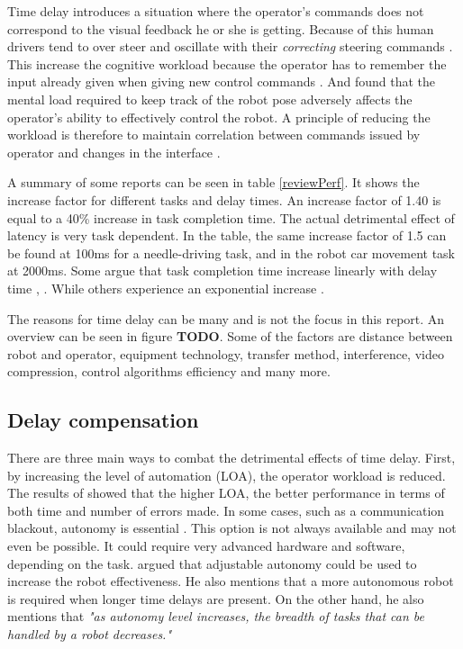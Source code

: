 Time delay introduces a situation where the operator's commands does not correspond to the visual feedback he or she is getting. Because of this human drivers tend to over steer and oscillate with their \emph{correcting} steering commands \citep{Appelqvist2007}. This increase the cognitive workload because the operator has to remember the input already given when giving new control commands \citep{Matheson2013}. And \citep{Ricks2004} found that the mental load required to keep track of the robot pose adversely affects the operator's ability to effectively control the robot. A principle of reducing the workload is therefore to maintain correlation between commands issued by operator and changes in the interface \citep{Nielsen2007}. 

A summary of some reports can be seen in table \ref{reviewPerf}. It shows the increase factor for different tasks and delay times. An increase factor of 1.40 is equal to a 40\% increase in task completion time. The actual detrimental effect of latency is very task dependent. In the table, the same increase factor of 1.5 can be found at 100ms for a needle-driving task, and in the robot car movement task at 2000ms.
Some argue that task completion time increase linearly with delay time \citep{Ando1999}, \citep{Lane2002}. While others experience an exponential increase \citep{Xu2014}.




The reasons for time delay can be many and is not the focus in this report. An overview can be seen in figure \textbf{TODO}. Some of the factors are distance between robot and operator, equipment technology, transfer method, interference, video compression, control algorithms efficiency and many more.



\subsection{Delay compensation}

There are three main ways to combat the detrimental effects of time delay. First, by increasing the level of automation (LOA), the operator workload is reduced. The results of \citep{Luck2006} showed that the higher LOA, the better performance in terms of both time and number of errors made. In some cases, such as a communication blackout, autonomy is essential \citep{Dorais1999}. This option is not always available and may not even be possible. It could require very advanced hardware and software, depending on the task. \citep{Goodrich2001} argued that adjustable autonomy could be used to increase the robot effectiveness. He also mentions that a more autonomous robot is required when longer time delays are present. On the other hand, he also mentions that \emph{"as autonomy level increases, the breadth of tasks that can be handled by a robot decreases."}

